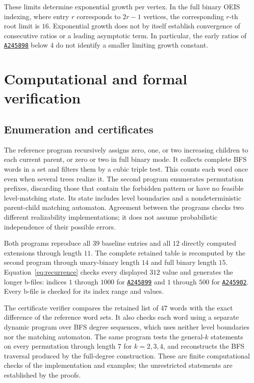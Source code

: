 \documentclass[11pt]{article}
\theoremstyle{definition}
\newcommand{\seq}[1]{\href{https://oeis.org/#1}{\texttt{#1}}}
\begin{document}
These limits determine exponential growth per vertex. In the full binary OEIS indexing, where entry $r$ corresponds to $2r-1$ vertices, the corresponding $r$-th root limit is $16$. Exponential growth does not by itself establish convergence of consecutive ratios or a leading asymptotic term. In particular, the early ratios of \seq{A245898} below $4$ do not identify a smaller limiting growth constant.

\section{Computational and formal verification}\label{sec:verification}

\subsection{Enumeration and certificates}
The reference program recursively assigns zero, one, or two increasing children to each current parent, or zero or two in full binary mode. It collects complete BFS words in a set and filters them by a cubic triple test. This counts each word once even when several trees realize it. The second program enumerates permutation prefixes, discarding those that contain the forbidden pattern or have no feasible level-matching state. Its state includes level boundaries and a nondeterministic parent-child matching automaton. Agreement between the programs checks two different realizability implementations; it does not assume probabilistic independence of their possible errors.

Both programs reproduce all $39$ baseline entries and all $12$ directly computed extensions through length $11$. The complete retained table is recomputed by the second program through unary-binary length $14$ and full binary length $15$. Equation~\eqref{eq:recurrence} checks every displayed $312$ value and generates the longer b-files: indices $1$ through $1000$ for \seq{A245899} and $1$ through $500$ for \seq{A245902}. Every b-file is checked for its index range and values.

The certificate verifier compares the retained list of $47$ words with the exact difference of the reference word sets. It also checks each word using a separate dynamic program over BFS degree sequences, which uses neither level boundaries nor the matching automaton. The same program tests the general-$k$ statements on every permutation through length $7$ for $k=2,3,4$, and reconstructs the BFS traversal produced by the full-degree construction. These are finite computational checks of the implementation and examples; the unrestricted statements are established by the proofs.
\end{document}
